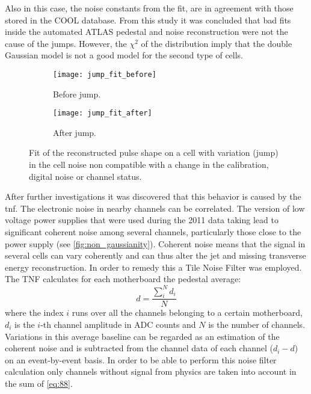 Also in this case, the noise constants from the fit, are in agreement with those
stored in the COOL database. From this study it was concluded that bad fits
inside the automated ATLAS pedestal and noise reconstruction were not the cause
of the jumps. However, the $\chi^2$ of the distribution imply that the double
Gaussian model is not a good model for the second type of cells.
\begin{figure}[!h]
  \centering
  \begin{subfigure}[t]{.8\linewidth}
    \texttt{[image: jump\_fit\_before]}
    \caption{Before jump.}
    \label{fig:jump_fit_before}
  \end{subfigure}

  \begin{subfigure}[t]{.8\linewidth}
    \texttt{[image: jump\_fit\_after]}
    \caption{After jump.}
    \label{fig:jump_fit_after}
  \end{subfigure}
  \caption{Fit of the reconstructed pulse shape on a cell with variation (jump)
    in the cell noise non compatible with a change in the calibration, digital
    noise or channel status.}
  \label{fig:jump_fit}
\end{figure}

After further investigations it was discovered that this behavior is caused by
the \gls{tnf}. The electronic noise in nearby channels can be correlated. The
version of low voltage power supplies that were used during the 2011 data taking
lead to significant coherent noise among several channels, particularly those
close to the power supply (see \cref{fig:non_gaussianity}). Coherent noise means
that the signal in several cells can vary coherently and can thus alter the jet
and missing transverse energy reconstruction. In order to remedy this a Tile
Noise Filter was employed. The TNF calculates for each motherboard the pedestal
average:
\begin{equation}
  \label{eq:88}
  d = \frac{\sum_i^N d_i}{N}
\end{equation}
where the index $i$ runs over all the channels belonging to a certain
motherboard, $d_i$ is the $i$-th channel amplitude in ADC counts and $N$ is the
number of channels. Variations in this average baseline can be regarded as an
estimation of the coherent noise and is subtracted from the channel data of each
channel ($d_i - d$) on an event-by-event basis. In order to be able to perform
this noise filter calculation only channels without signal from physics are
taken into account in the sum of \cref{eq:88}.

